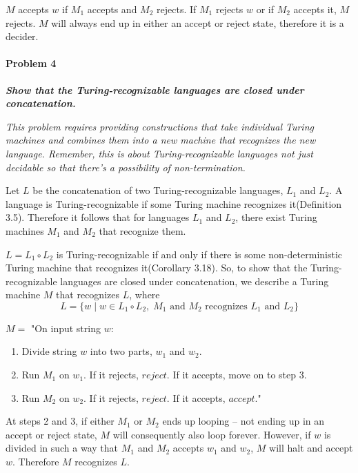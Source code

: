 \documentclass{article}
\begin{document}
\begin{enumerate}[\indent a)]
    
$M$ accepts $w$ if $M_1$ accepts and $M_2$ rejects. If $M_1$ rejects $w$ or if $M_2$ accepts it, $M$ rejects. $M$ will always end up in either an accept or reject state, therefore it is a decider.

\end{enumerate} 

\paragraph{Problem 4}
\textit{\textbf{Show that the Turing-recognizable languages are closed under concatenation.}}

\noindent \textit{This problem requires providing constructions that take individual Turing machines and combines them into a new machine that {\em recognizes} the new language. Remember, this is about Turing-recognizable languages not just decidable so that there's a possibility of non-termination.}\newline

\noindent Let $L$ be the concatenation of two Turing-recognizable languages, $L_1$ and $L_2$. A language is Turing-recognizable if some Turing machine recognizes it(Definition 3.5). Therefore it follows that for languages $L_1$ and $L_2$, there exist Turing machines $M_1$ and $M_2$ that recognize them.

\noindent $L = L_1 \circ L_2$ is Turing-recognizable if and only if there is some non-deterministic Turing machine that recognizes it(Corollary 3.18). So, to show that the Turing-recognizable languages are closed under concatenation, we describe a Turing machine $M$ that recognizes $L$, where
$$L = \{w \;|\;  w \in L_1\circ L_2,\; M_1 \text{ and  $M_2$ recognizes $L_1$ and $L_2$}\}$$

\noindent $M = $ "On input string $w$: 
    \begin{enumerate}[\indent 1.]
    \item Divide string $w$ into two parts, $w_1$ and $w_2$.
    \item Run $M_1$ on $w_1$. If it rejects, $reject$. If it accepts, move on to step 3.
    \item Run $M_2$ on $w_2$. If it rejects, $reject$. If it accepts, $accept$."
    \end{enumerate}
    
    \noindent At steps 2 and 3, if either $M_1$ or $M_2$ ends up looping -- not ending up in an accept or reject state, $M$ will consequently also loop forever. However, if $w$ is divided in such a way that $M_1$ and $M_2$ accepts $w_1$ and $w_2$, $M$ will halt and accept $w$. Therefore $M$ recognizes $L$.
    
\end{document}
